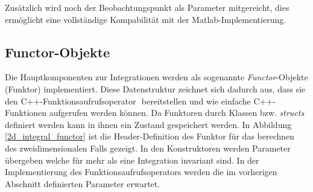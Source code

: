 Zusätzlich wird noch der Beobachtungspunkt als Parameter mitgereicht, dies ermöglicht eine vollständige Kompabilität mit der Matlab-Implementierung.
\begin{center}
    
    \label{configuration}
\end{center}


\subsection{Functor-Objekte}\label{sec_functor}

Die Hauptkomponenten zur Integrationen werden als sogenannte \textit{Functor}-Objekte (Funktor) implementiert.
Diese Datenstruktur zeichnet sich dadurch aus, dass sie den C++-Funktionsaufrufsoperator \textit{\(\)} bereitstellen und wie einfache C++-Funktionen aufgerufen werden können.
Da Funktoren durch Klassen bzw. \textit{structs} definiert werden kann in ihnen ein Zustand gespeichert werden.
In Abbildung \ref{2d_integral_functor} ist die Header-Definition des Funktor für das berechnen des zweidimensionalen Falls gezeigt.
In den Konstruktoren werden Parameter übergeben welche für mehr als eine Integration invariant sind. In der Implementierung des Funktionsaufrufsoperators werden die im vorherigen Abschnitt definierten Parameter erwartet.

\begin{center}
    
    \label{2d_integral_functor}
\end{center}